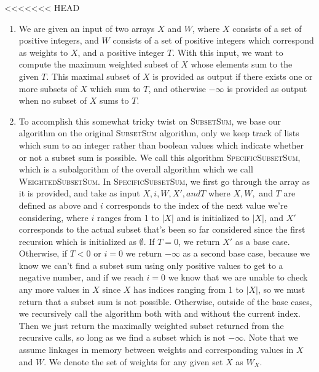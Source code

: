 \documentclass{article}
\begin{document}
<<<<<<< HEAD
\begin{enumerate}
	\item
		We are given an input of two arrays $X$ and $W$, where $X$ consists of a set of positive integers,
		and $W$ consists of a set of positive integers which correspond as weights to $X$, and a positive
		integer $T$. With this input, we want to compute the maximum weighted subset of $X$ whose elements 
		sum to the given $T$. This maximal subset of $X$ is provided as output if there exists one or more
		subsets of $X$ which sum to $T$, and otherwise $-\infty$ is provided as output when no subset of
		$X$ sums to $T$.
	\item
		To accomplish this somewhat tricky twist on \textsc{SubsetSum}, we base our algorithm on the original
		\textsc{SubsetSum} algorithm, only we keep track of lists which sum to an integer rather than boolean
		values which indicate whether or not a subset sum is possible. We call this algorithm 
		\textsc{SpecificSubsetSum}, which is a subalgorithm of the overall algorithm which we call
		\textsc{WeightedSubsetSum}. In \textsc{SpecificSubsetSum}, we first go through the array as it is
		provided, and take as input $X, i, W, X', and T$ where $X, W,$ and $T$ are defined as above and $i$
		corresponds to the index of the next value we're considering, where $i$ ranges from 1 to $|X|$
		and is initialized to $|X|$,
		and $X'$ corresponds to the actual subset that's been so far considered since the first recursion 
		which is initialized as $\emptyset$.
		If $T=0$, we return $X'$  as a base case. Otherwise, if $T<0$ or $i = 0$ we return $-\infty$ as a
		second base case, because we know we can't find a subset sum using only positive values to get to
		a negative number, and if we reach $i=0$ we know that we are unable to check any more values in $X$
		since $X$ has indices ranging from 1 to $|X|$, so we must return that a subset sum is not possible.
		Otherwise, outside of the base cases, we recursively call the algorithm both with and without the
		current index. Then we just return the maximally weighted subset returned from the recursive calls,
		so long as we find a subset which is not $-\infty$. Note that we assume linkages in memory between
		weights and corresponding values in $X$ and $W$. We denote the set of weights for any given set $X$
		as $W_{X}$.


\end{enumerate}
\end{document}
